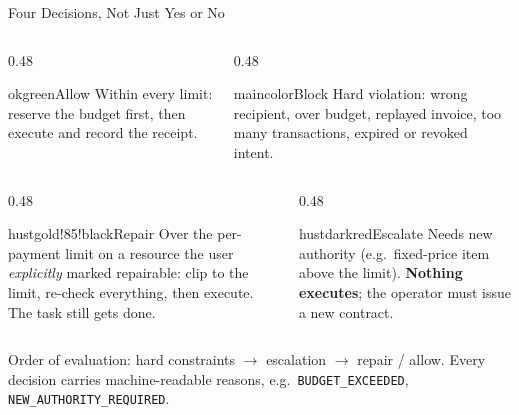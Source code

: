 \documentclass{beamer}
\begin{document}
\begin{frame}{Four Decisions, Not Just Yes or No}
\begin{columns}[T,onlytextwidth]
  \begin{column}{0.48\textwidth}
    \begin{colorblock}[white]{okgreen}{Allow}
      \footnotesize Within every limit: reserve the budget first, then
      execute and record the receipt.
    \end{colorblock}
  \end{column}
  \begin{column}{0.48\textwidth}
    \begin{colorblock}[white]{maincolor}{Block}
      \footnotesize Hard violation: wrong recipient, over budget, replayed
      invoice, too many transactions, expired or revoked intent.
    \end{colorblock}
  \end{column}
\end{columns}
\vspace{2mm}
\begin{columns}[T,onlytextwidth]
  \begin{column}{0.48\textwidth}
    \begin{colorblock}[white]{hustgold!85!black}{Repair}
      \footnotesize Over the per-payment limit on a resource the user
      \emph{explicitly} marked repairable: clip to the limit, re-check
      everything, then execute. The task still gets done.
    \end{colorblock}
  \end{column}
  \begin{column}{0.48\textwidth}
    \begin{colorblock}[white]{hustdarkred}{Escalate}
      \footnotesize Needs new authority (e.g.\ fixed-price item above the
      limit). \textbf{Nothing executes}; the operator must issue a new
      contract.
    \end{colorblock}
  \end{column}
\end{columns}

\vspace{4mm}
\footnotesize
\begin{center}
Order of evaluation: hard constraints \(\rightarrow\) escalation
\(\rightarrow\) repair / allow. Every decision carries machine-readable
reasons, e.g.\ \texttt{BUDGET\_EXCEEDED}, \texttt{NEW\_AUTHORITY\_REQUIRED}.
\end{center}
\end{frame}
\end{document}
